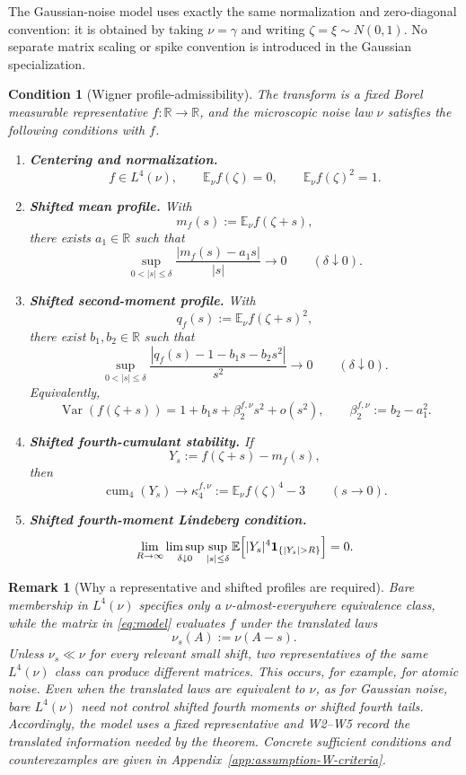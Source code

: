 \documentclass[10pt,a4paper]{amsart}
\newtheorem{condition}[theorem]{Condition}
\newtheorem{remark}[theorem]{Remark}
\newcommand{\E}{\mathbb E}
\newcommand{\Var}{\operatorname{Var}}
\newcommand{\cum}{\operatorname{cum}}
\begin{document}
The Gaussian-noise model uses exactly the same normalization and zero-diagonal
convention: it is obtained by taking \(\nu=\gamma\) and writing
\(\zeta=\xi\sim N(0,1)\).  No separate matrix scaling or spike convention is
introduced in the Gaussian specialization.

\begin{condition}[Wigner profile-admissibility]\label{cond:profile-admissibility}
The transform is a fixed Borel measurable representative
$f:\mathbb R\to\mathbb R$, and the microscopic noise law $\nu$ satisfies the
following conditions with $f$.
\begin{enumerate}[label=(W\arabic*)]
\item \textbf{Centering and normalization.}
\[
        f\in L^4(\nu),\qquad
        \E_\nu f(\zeta)=0,\qquad
        \E_\nu f(\zeta)^2=1 .
\]
\item \textbf{Shifted mean profile.} With
\[
        m_f(s):=\E_\nu f(\zeta+s),
\]
there exists $a_1\in\mathbb R$ such that
\[
        \sup_{0<|s|\le\delta}
        \frac{|m_f(s)-a_1s|}{|s|}\longrightarrow0
        \qquad(\delta\downarrow0).
\]
\item \textbf{Shifted second-moment profile.} With
\[
        q_f(s):=\E_\nu f(\zeta+s)^2,
\]
there exist $b_1,b_2\in\mathbb R$ such that
\[
        \sup_{0<|s|\le\delta}
        \frac{|q_f(s)-1-b_1s-b_2s^2|}{s^2}\longrightarrow0
        \qquad(\delta\downarrow0).
\]
Equivalently,
\[
        \Var(f(\zeta+s))
        =1+b_1s+\beta_2^{f,\nu}s^2+o(s^2),\qquad
        \beta_2^{f,\nu}:=b_2-a_1^2.
\]
\item \textbf{Shifted fourth-cumulant stability.} If
\[
        Y_s:=f(\zeta+s)-m_f(s),
\]
then
\[
        \cum_4(Y_s)\longrightarrow
        \kappa_4^{f,\nu}:=\E_\nu f(\zeta)^4-3
        \qquad(s\to0).
\]
\item \textbf{Shifted fourth-moment Lindeberg condition.}
\[
        \lim_{R\to\infty}\limsup_{\delta\downarrow0}
        \sup_{|s|\le\delta}
        \E\Bigl[|Y_s|^4{\bf 1}_{\{|Y_s|>R\}}\Bigr]=0.
\]
\end{enumerate}
\end{condition}

\begin{remark}[Why a representative and shifted profiles are required]
Bare membership in $L^4(\nu)$ specifies only a $\nu$-almost-everywhere
equivalence class, while the matrix in \eqref{eq:model} evaluates $f$ under
the translated laws
\[
 \nu_s(A):=\nu(A-s).
\]
Unless $\nu_s\ll\nu$ for every relevant small shift, two representatives of
the same $L^4(\nu)$ class can produce different matrices.  This occurs, for
example, for atomic noise.  Even when the translated laws are equivalent to
$\nu$, as for Gaussian noise, bare $L^4(\nu)$ need not control shifted fourth
moments or shifted fourth tails.  Accordingly, the model uses a fixed
representative and W2--W5 record the translated information needed by the
theorem.  Concrete sufficient conditions and counterexamples are given in
Appendix~\ref{app:assumption-W-criteria}.
\end{remark}
\end{document}
